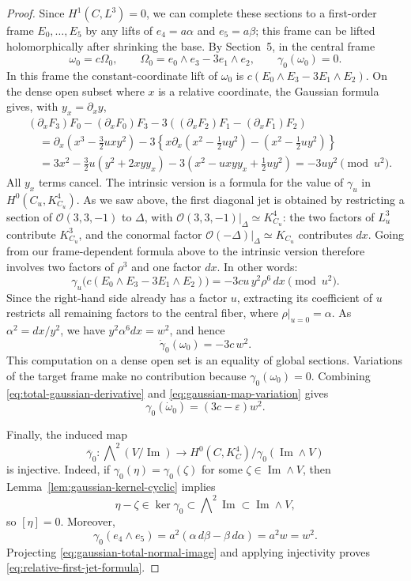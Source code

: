\documentclass[11pt]{article}
\newcommand{\OO}{\mathcal O}
\begin{document}
\begin{proof}
Since $H^1(C,L^3)=0$, we can complete these sections to a first-order frame
$E_0,\ldots,E_5$ by any lifts of $e_4=a\alpha$ and $e_5=a\beta$;
this frame can be lifted holomorphically after shrinking the {base}.
By Section~5, in the central frame
\[
\omega_0=c\Omega_0,\qquad
\Omega_0=e_0\wedge e_3-3e_1\wedge e_2,
\qquad\gamma_0(\omega_0)=0.
\]
In this frame the constant-coordinate lift of $\omega_0$ is
$c(E_0\wedge E_3-3E_1\wedge E_2)$. On the dense open subset where
$x$ is a relative coordinate, the Gaussian formula gives, with
$y_x=\partial_xy$,
{
\[
\begin{aligned}
&(\partial_x F_3) F_0 -(\partial_x F_0) F_3 -3((\partial_x F_2) F_1 - (\partial_x F_1) F_2) \\
&\quad=\partial_x\left(x^3-\tfrac32uxy^2\right)
-3\left\{x\partial_x\left(x^2-\tfrac12uy^2\right)
-\left(x^2-\tfrac12uy^2\right)\right\}\\
&\quad=3x^2-\tfrac32u(y^2+2xyy_x)
-3\left(x^2-uxyy_x+\tfrac12uy^2\right)
=-3uy^2\pmod{u^2}.
\end{aligned}
\]}
All $y_x$ terms cancel.
{The intrinsic version is a formula for the value of $\gamma_u$ in
$H^0(C_u,K_{C_u}^4)$.
As we saw above, the first diagonal jet is obtained by restricting
a section of $\OO(3,3,-1)$ to $\Delta$, with
$\OO(3,3,-1)|_\Delta\simeq K_{C_u}^4$:
the two factors of $L_u^3$ contribute $K_{C_u}^3$,
and the conormal factor $\OO(-\Delta)|_\Delta\simeq K_{C_u}$
contributes $dx$.
Going from our frame-dependent formula above to the intrinsic version
therefore involves two factors of $\rho^3$ and one factor $dx$.
In other words:}
\[
\gamma_u\bigl(c(E_0\wedge E_3-3E_1\wedge E_2)\bigr)
=-3cu\,y^2\rho^6\,dx\pmod{u^2}.
\]
Since the right-hand side already has a factor $u$, extracting its
coefficient of $u$ restricts all remaining factors to the central fiber,
where $\rho|_{u=0}=\alpha$. As $\alpha^2=dx/y^2$, we have
$y^2\alpha^6dx=w^2$, and hence
\begin{equation}
\label{eq:gaussian-map-variation}
\dot\gamma_0(\omega_0)=-3c\,w^2.
\end{equation}
This computation on a dense open set is an equality of global
sections. Variations of the target frame make no contribution because
$\gamma_0(\omega_0)=0$. Combining
\eqref{eq:total-gaussian-derivative} and
\eqref{eq:gaussian-map-variation} gives
\begin{equation}
\label{eq:gaussian-total-normal-image}
\gamma_0(\dot\omega_0)=(3c-\varepsilon)w^2.
\end{equation}

Finally, the induced map
\[
\overline\gamma_0:
\bigwedge\nolimits^2(V/\operatorname{Im})
\longrightarrow H^0(C,K_C^4)/\gamma_0(\operatorname{Im}\wedge V)
\]
is injective. Indeed, if $\gamma_0(\eta)=\gamma_0(\zeta)$ for some
$\zeta\in\operatorname{Im}\wedge V$, then
Lemma~\ref{lem:gaussian-kernel-cyclic} implies
\[
\eta-\zeta\in\ker\gamma_0
\subset\bigwedge\nolimits^2\operatorname{Im}
\subset\operatorname{Im}\wedge V,
\]
so $[\eta]=0$. Moreover,
\[
\gamma_0(e_4\wedge e_5)
=a^2(\alpha\,d\beta-\beta\,d\alpha)=a^2w=w^2.
\]
Projecting \eqref{eq:gaussian-total-normal-image} and applying
injectivity proves \eqref{eq:relative-first-jet-formula}.
\end{proof}
\endgroup
\end{document}
